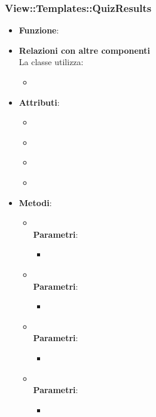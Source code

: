 \subsubsection{View::Templates::QuizResults}
\begin{itemize}
\item\textbf{Funzione}:
\item\textbf{Relazioni con altre componenti}\\
La classe utilizza:
	\begin{itemize}
		\item
	\end{itemize}
\item\textbf{Attributi}:
	\begin{itemize}
		\item\code{}\\
		\item\code{}\\
		\item\code{}\\
		\item\code{}\\
	\end{itemize}
\item\textbf{Metodi}:
	\begin{itemize}
		\item\code{}\\
		\textbf{Parametri}:
			\begin{itemize}
				\item\code{}\\
			\end{itemize}
		\item\code{}\\
		\textbf{Parametri}:
			\begin{itemize}
				\item\code{}\\
			\end{itemize}
		\item\code{}\\
		\textbf{Parametri}:
			\begin{itemize}
				\item\code{}\\
			\end{itemize}
		\item\code{}\\
		\textbf{Parametri}:
			\begin{itemize}
				\item\code{}\\
			\end{itemize}
	\end{itemize}
\end{itemize}

